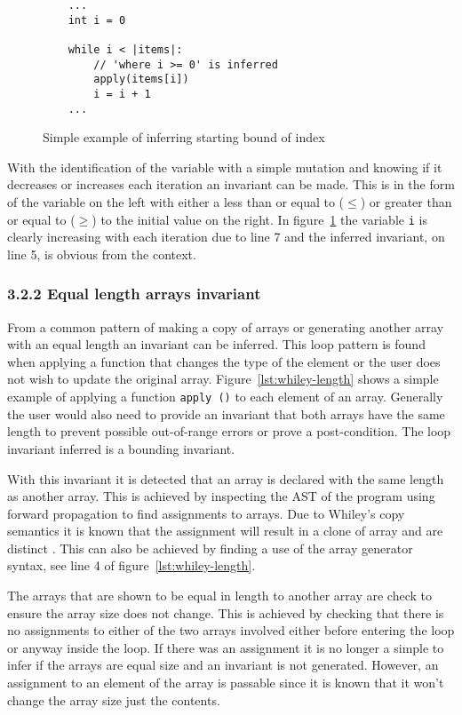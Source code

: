 \documentclass[11pt, a4paper, twoside, openright]{report}
\newcommand{\code}[1]{\texttt{#1}}
\begin{document}
\begin{figure}[ht]
\begin{lstlisting}
    ...
    int i = 0

    while i < |items|:
        // 'where i >= 0' is inferred
        apply(items[i])
        i = i + 1
    ...
\end{lstlisting}
\caption{Simple example of inferring starting bound of index}
\label{lst:whiley-start}
\end{figure}

With the identification of the variable with a simple mutation and knowing
if it decreases or increases each iteration an invariant can be made.
This is in the form of the variable on the left with either a less than or
equal to ($\leq$) or greater than or equal to ($\geq$) to the initial value on the
right.
In figure~\ref{lst:whiley-start} the variable \code{i} is clearly increasing
with each iteration due to line 7 and the inferred invariant, on line 5, is
obvious from the context.

\subsubsection*{3.2.2 Equal length arrays invariant}

From a common pattern of making a copy of arrays or generating another array
with an equal length an invariant can be inferred.
This loop pattern is found when applying a function that changes the type of
the element or the user does not wish to update the original array.
Figure~\ref{lst:whiley-length} shows a simple example of applying a function
\code{apply ()} to each element of an array.
Generally the user would also need to provide an invariant that both arrays
have the same length to prevent possible out-of-range errors or prove a
post-condition.
The loop invariant inferred is a bounding invariant.

With this invariant it is detected that an array is declared with the same
length as another array.
This is achieved by inspecting the AST of the program
using forward propagation to find assignments to arrays.
Due to Whiley's copy semantics it is known that the assignment will result
in a clone of array and are distinct \cite{whiley-origin} \cite{whiley-arrays}.
This can also be achieved by finding a use of the array
generator syntax, see line 4 of figure~\ref{lst:whiley-length}.

The arrays that are shown to be equal in length to another array are
check to ensure the array size does not change.
This is achieved by checking that there is no assignments to either
of the two arrays involved either before entering the loop or
anyway inside the loop.
If there was an assignment it is no longer a simple to infer if
the arrays are equal size and an invariant is not generated.
However, an assignment to an element of the array is passable since it
is known that it won't change the array size just the contents.
\end{document}
